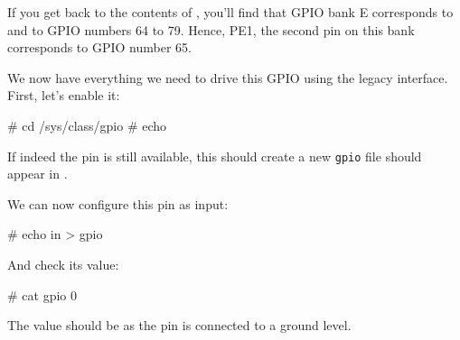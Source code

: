 If you get back to the contents of , you'll
find that GPIO bank E corresponds to  and to GPIO
numbers 64 to 79. Hence, PE1, the second pin on this bank corresponds to
GPIO number 65.

We now have everything we need to drive this GPIO using the legacy
interface. First, let's enable it:

\begin{bashinput}
# cd /sys/class/gpio
# echo %
\end{bashinput}

If indeed the pin is still available, this should create a new
{\tt gpio\gpionum} file should appear in .

We can now configure this pin as input:

\begin{bashinput}
# echo in > gpio%
\end{bashinput}

And check its value:

\begin{bashinput}
# cat gpio%
0
\end{bashinput}

The value should be  as the pin is connected to a ground level.

